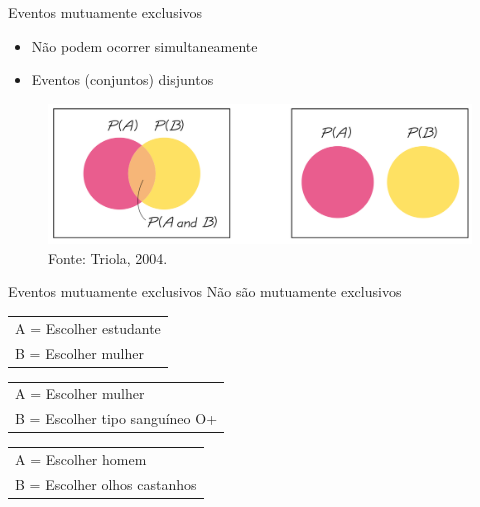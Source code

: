 \documentclass{beamer}
\begin{document}
\begin{frame}{Eventos mutuamente exclusivos}
  \begin{itemize}
  \item Não podem ocorrer simultaneamente
  \item Eventos (conjuntos) disjuntos
  \end{itemize}
  \begin{figure}
    \centering
    \includegraphics[height=0.4\textheight]{Prob_I/venn}
    \caption{Fonte: Triola, 2004.}
  \end{figure}
\end{frame}

\begin{frame}{Eventos mutuamente exclusivos}
  \alert{Não} são mutuamente exclusivos
  \begin{example}
    \begin{tabular}{l}
      A = Escolher estudante\\
      B = Escolher mulher\\
    \end{tabular}
  \end{example}
  \begin{example}
    \begin{tabular}{l}
      A = Escolher mulher\\
      B = Escolher tipo sanguíneo O+\\
    \end{tabular}
  \end{example}
  \begin{example}
    \begin{tabular}{l}
      A = Escolher homem\\
      B = Escolher olhos castanhos\\
    \end{tabular}
  \end{example}
\end{frame}
\end{document}

